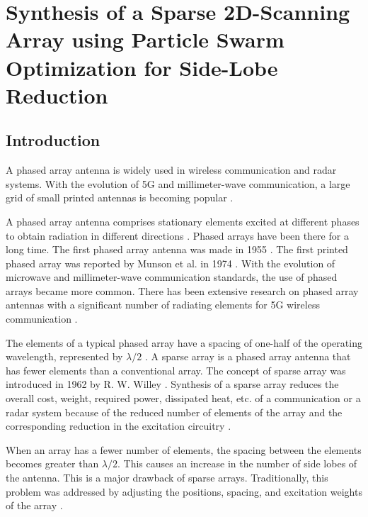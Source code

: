 \chapter{Synthesis of a Sparse 2D-Scanning Array using Particle Swarm Optimization for Side-Lobe Reduction}
\label{chap:chap5}
\section{Introduction}\label{c5sec_intro}
A phased array antenna is widely used in wireless communication and radar systems. With the evolution of 5G and millimeter-wave communication, a large grid of small printed antennas is becoming popular \cite{5gmmwave, 5gmmwave_fr4}.

A phased array antenna comprises stationary elements excited at different phases to obtain radiation in different directions \cite{phasedArrayHandbook}. Phased arrays have been there for a long time. The first phased array antenna was made in 1955 \cite{phasedArray_russia}. The first printed phased array was reported by Munson et al. in 1974 \cite{txmPhasedArray}. With the evolution of microwave and millimeter-wave communication standards, the use of phased arrays became more common. There has been extensive research on phased array antennas with a significant number of radiating elements for 5G wireless communication \cite{mmarrayRrev}.

The elements of a typical phased array have a spacing of one-half of the operating wavelength, represented by $\lambda/2$ \cite{phasedArrayHandbook}. A sparse array is a phased array antenna that has fewer elements than a conventional array. The concept of sparse array was introduced in 1962 by R. W. Willey \cite{sparse_rect_planar}. Synthesis of a sparse array reduces the overall cost, weight, required power, dissipated heat, etc. of a communication or a radar system because of the reduced number of elements of the array and the corresponding reduction in the excitation circuitry \cite{sparseDesignConstraints}.

When an array has a fewer number of elements, the spacing between the elements becomes greater than $\lambda/2$. This causes an increase in the number of side lobes of the antenna. This is a major drawback of sparse arrays. Traditionally, this problem was addressed by adjusting the positions, spacing, and excitation weights of the array \cite{sparseDesignConstraints}.

